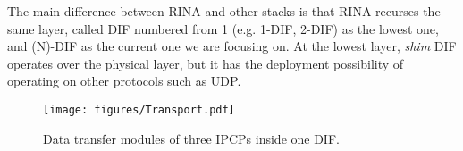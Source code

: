 \documentclass{ieeeaccess}
\begin{document}
The main difference between RINA and other stacks is that RINA recurses the same layer, called DIF numbered from 1 (e.g. 1-DIF, 2-DIF) as the lowest one, and (N)-DIF as the current one we are focusing on. At the lowest layer, \textit{shim} DIF operates over the physical layer, but it has the deployment possibility of operating on other protocols such as UDP.

\begin{figure}[!t]
	\centering
	\texttt{[image: figures/Transport.pdf]}
	\caption{Data transfer modules of three IPCPs inside one DIF.}
	\label{fig:rina-trans}
\end{figure}


\end{document}
